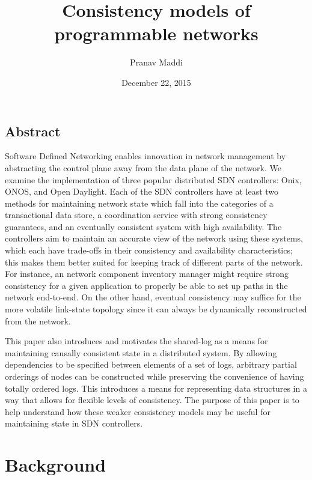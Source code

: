 \documentclass[letterpaper,twocolumn,10pt]{article}
\begin{document}
\title{\Large Consistency models of programmable networks}

\author{Pranav Maddi}

\date{December 22, 2015}
\maketitle

\tableofcontents

\subsection*{Abstract}

Software Defined Networking enables innovation in network management by abstracting the control plane away from the data plane of the network. We examine the implementation of three popular distributed SDN controllers: Onix, ONOS, and Open Daylight. Each of the SDN controllers have at least two methods for maintaining network state which fall into the categories of a transactional data store, a coordination service with strong consistency guarantees, and an eventually consistent system with high availability. The controllers aim to maintain an accurate view of the network using these systems, which each have trade-offs in their consistency and availability characteristics; this makes them better suited for keeping track of different parts of the network. For instance, an network component inventory manager might require strong consistency for a given application to properly be able to set up paths in the network end-to-end. On the other hand, eventual consistency may suffice for the more volatile link-state topology since it can always be dynamically reconstructed from the network.

This paper also introduces and motivates the shared-log as a means for maintaining causally consistent state in a distributed system. By allowing dependencies to be specified between elements of a set of logs, arbitrary partial orderings of nodes can be constructed while preserving the convenience of having totally ordered logs. This introduces a means for representing data structures in a way that allows for flexible levels of consistency. The purpose of this paper is to help understand how these weaker consistency models may be useful for maintaining state in SDN controllers. 

\section{Background}
\end{document}
